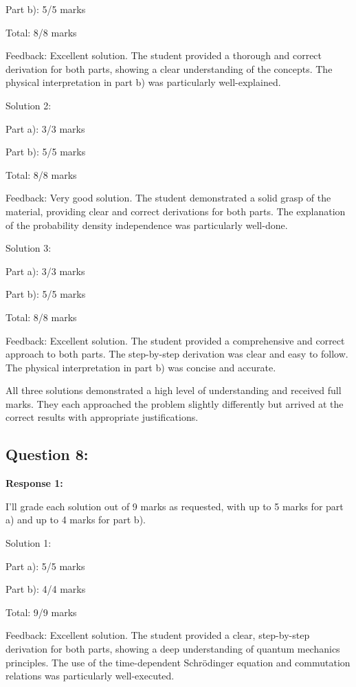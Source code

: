 \documentclass[a4paper,11pt]{article}
\begin{document}
Part b): 5/5 marks

Total: 8/8 marks

Feedback: Excellent solution. The student provided a thorough and correct derivation for both parts, showing a clear understanding of the concepts. The physical interpretation in part b) was particularly well-explained.

Solution 2:

Part a): 3/3 marks

Part b): 5/5 marks

Total: 8/8 marks

Feedback: Very good solution. The student demonstrated a solid grasp of the material, providing clear and correct derivations for both parts. The explanation of the probability density independence was particularly well-done.

Solution 3:

Part a): 3/3 marks

Part b): 5/5 marks

Total: 8/8 marks

Feedback: Excellent solution. The student provided a comprehensive and correct approach to both parts. The step-by-step derivation was clear and easy to follow. The physical interpretation in part b) was concise and accurate.

All three solutions demonstrated a high level of understanding and received full marks. They each approached the problem slightly differently but arrived at the correct results with appropriate justifications.

\subsection*{Question 8:}

\textbf{Response 1:}

I'll grade each solution out of 9 marks as requested, with up to 5 marks for part a) and up to 4 marks for part b).

Solution 1:

Part a): 5/5 marks

Part b): 4/4 marks

Total: 9/9 marks

Feedback: Excellent solution. The student provided a clear, step-by-step derivation for both parts, showing a deep understanding of quantum mechanics principles. The use of the time-dependent Schrödinger equation and commutation relations was particularly well-executed.
\end{document}
